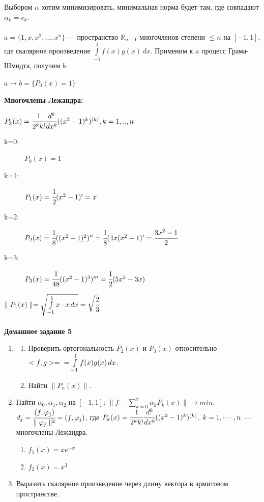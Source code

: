 \documentclass[a4paper,12pt]{article}
\begin{document}
\begin{defintion}
Выбором $\alpha$ хотим минимизировать, минимальная норма будет там, где совпадают $\alpha_k = c_k$.\\
\\
$a = \{1, x, x^2,..., x^n\}$ --- пространство $\mathbb{R}_{n+1}$ многочленов степени $\leqslant n$ на $[-1, 1]$, где скалярное произведение $\int\limits_{-1}^1 f(x)g(x)\,dx$. Применим к $a$ процесс Грама-Шмидта, получим $b$.\begin{center}
	$a \to b = \{P_0(x)=1\}$\end{center}
\textbf{Многочлены Лежандра:} \begin{center}$P_k(x) = \cfrac{1}{2^k k!}\cfrac{d^k}{dx^k}((x^2-1)^k)^{(k)}, k=1,..,n$\end{center}\begin{description} 
	\item[k=0:] $P_0(x)=1$
	\item[k=1:] $P_1(x)=\cfrac{1}{2}(x^2-1)'=x$
	\item[k=2:] $P_2(x)=\cfrac{1}{8}((x^2-1)^2)''=\cfrac{1}{8}(4x(x^2-1)'=\cfrac{3x^2-1}{2}$
	\item[k=3:] $P_3(x)=\cfrac{1}{48}((x^2-1)^3)'''=\cfrac{1}{2}(5x^3-3x)$\end{description}
$\parallel P_1(x) \parallel = \sqrt{\int\limits_{-1}^1 x \cdot x\,dx} = \sqrt{\cfrac{2}{3}}$\\
\\
\textbf{Домашнее задание 5}\begin{enumerate}
	\item
	\begin{enumerate}
		\item Проверить ортогональность $P_2(x)$ и $P_3(x)$ относительно $<f, g> =\\= \int\limits_{-1}^1 f(x)g(x)\,dx$.
		\item Найти $\parallel P_n(x) \parallel$.
	\end{enumerate}
	\item
	Найти $\alpha_0, \alpha_1, \alpha_2$ на $[-1, 1]$: $\parallel f - \sum\limits_{k=0}^2 \alpha_kP_k(x) \parallel \to min$, $d_j=\cfrac{(f, \varphi_j)}{\parallel \varphi_j \parallel^2} = (f, \varphi_j)$, где $P_k(x)=\cfrac{1}{2^k k!}\cfrac{d^k}{dx^k}((x^2-1)^k)^{(k)},~k=1,\cdots, n$ --- многочлены Лежандра.
	\begin{enumerate}
		\item $f_1(x)=xe^{-x}$
		\item $f_2(x)=x^3$\\
	\end{enumerate}
	\item
	Выразить скалярное произведение через длину вектора в эрмитовом пространстве.\end{enumerate}



\end{defintion}
\end{document}
